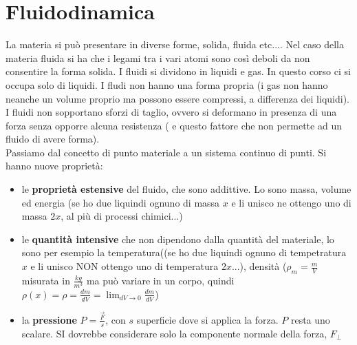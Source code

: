 \documentclass[a4paper,12pt, oneside]{book}
\begin{document}
\chapter{Fluidodinamica}
La materia si può presentare in diverse forme, solida, fluida etc.... Nel caso della materia fluida si ha che i legami tra i vari atomi sono così deboli da non consentire la forma solida. I fluidi si dividono in liquidi e gas. In questo corso ci si occupa solo di liquidi. I fludi non hanno una forma propria (i gas non hanno neanche un volume proprio ma possono essere compressi, a differenza dei liquidi). I fluidi non sopportano sforzi di taglio, ovvero si deformano in presenza di una forza senza opporre alcuna resistenza ( e questo fattore che non permette ad un fluido di avere forma). \\
Passiamo dal concetto di punto materiale a un sistema continuo di punti. Si hanno nuove proprietà:
\begin{itemize}
\item le \textbf{proprietà estensive} del fluido, che sono addittive. Lo sono massa, volume ed energia (se ho due liquindi ognuno di massa $x$ e li unisco ne ottengo uno di massa $2x$, al più di processi chimici...)
\item le \textbf{quantità intensive} che non dipendono dalla quantità del materiale, lo sono per esempio la temperatura((se ho due liquindi ognuno di tempetratura $x$ e li unisco NON ottengo uno di temperatura $2x$...), densità ($\rho_m=\frac{m}{V}$ misurata in $\frac{kg}{m^3}$ ma può variare in un corpo, quindi $\rho(x)=\rho=\frac{dm}{dV}=\lim_{dV\to 0}\frac{dm}{dV}$)
\item la \textbf{pressione} $P=\frac{\vec{F}}{s}$, con $s$ superficie dove si applica la forza. $P$ resta uno scalare. SI dovrebbe considerare solo la componente normale della forza, $F_{\perp}$
\end{itemize}
\newpage
\end{document}
